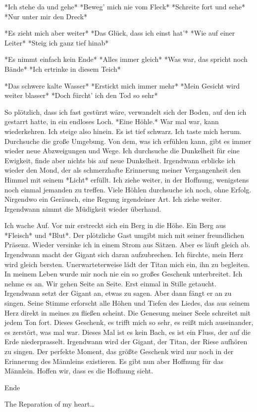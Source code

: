 \documentclass{article}
\begin{document}
	*Ich stehe da und gehe*  
	*Beweg’ mich nie vom Fleck*  
	*Schreite fort und sehe*  
	*Nur unter mir den Dreck*
	
	*Es zieht mich aber weiter*  
	*Das Glück, dass ich einst hat’*  
	*Wie auf einer Leiter*  
	*Steig ich ganz tief hinab*
	
	*Es nimmt einfach kein Ende*  
	*Alles immer gleich*  
	*Was war, das spricht noch Bände*  
	*Ich ertrinke in diesem Teich*
	
	*Das schwere kalte Wasser*  
	*Erstickt mich immer mehr*  
	*Mein Gesicht wird weiter blasser*  
	*Doch fürcht’ ich den Tod so sehr*
	
	So plötzlich, dass ich fast gestürzt wäre, verwandelt sich der Boden, auf den ich gestarrt hatte, in ein endloses Loch. *Eine Höhle.* War mal war, kann wiederkehren. Ich steige also hinein. Es ist tief schwarz. Ich taste mich herum. Durchsuche die große Umgebung. Von dem, was ich erfühlen kann, gibt es immer wieder neue Abzweigungen und Wege. Ich durchsuche die Dunkelheit für eine Ewigkeit, finde aber nichts bis auf neue Dunkelheit. Irgendwann erblicke ich wieder den Mond, der als schmerzhafte Erinnerung meiner Vergangenheit den Himmel mit seinem *Licht* erfüllt. Ich ziehe weiter, in der Hoffnung, wenigstens noch einmal jemanden zu treffen.  
	Viele Höhlen durchsuche ich noch, ohne Erfolg. Nirgendwo ein Geräusch, eine Regung irgendeiner Art. Ich ziehe weiter. Irgendwann nimmt die Müdigkeit wieder überhand.
	
	Ich wache Auf.  
	Vor mir erstreckt sich ein Berg in die Höhe. Ein Berg aus *Fleisch* und *Blut*. Der plötzliche Gast umgibt mich mit seiner freundlichen Präsenz. Wieder versinke ich in einem Strom aus Sätzen. Aber es läuft gleich ab. Irgendwann macht der Gigant sich daran aufzubrechen. Ich fürchte, mein Herz wird gleich bersten. Unerwarteterweise lädt der Titan mich ein, ihn zu begleiten. In meinem Leben wurde mir noch nie ein so großes Geschenk unterbreitet. Ich nehme es an.  
	Wir gehen Seite an Seite. Erst einmal in Stille getaucht. Irgendwann setzt der Gigant an, etwas zu sagen. Aber dann fängt er an zu singen. Seine Stimme erforscht alle Höhen und Tiefen des Liedes, das aus seinem Herz direkt in meines zu fließen scheint. Die Genesung meiner Seele schreitet mit jedem Ton fort. Dieses Geschenk, es trifft mich so sehr, es reißt mich auseinander, es zerstört, was mal war. Dieses Mal ist es kein Bach, es ist ein Fluss, der auf die Erde niederprasselt. Irgendwann wird der Gigant, der Titan, der Riese aufhören zu singen. Der perfekte Moment, das größte Geschenk wird nur noch in der Erinnerung des Männleins existieren. Es gibt nun aber Hoffnung für das Männlein. Hoffen wir, dass es die Hoffnung sieht.
	
	Ende
	
	The Reparation of my heart…
\end{document}
